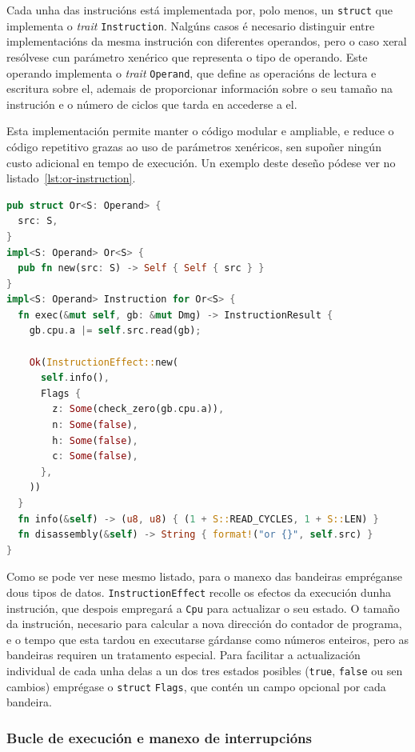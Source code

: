 Cada unha das instrucións está implementada por, polo menos, un \texttt{struct} que implementa o \textit{trait} \texttt{Instruction}.
Nalgúns casos é necesario distinguir entre implementacións da mesma instrución con diferentes operandos,
pero o caso xeral resólvese cun parámetro xenérico que representa o tipo de operando.
Este operando implementa o \textit{trait} \texttt{Operand}, que define as operacións de lectura e escritura sobre el,
ademais de proporcionar información sobre o seu tamaño na instrución e o número de ciclos que tarda en accederse a el.

Esta implementación permite manter o código modular e ampliable, e reduce o código repetitivo grazas ao uso de parámetros xenéricos,
sen supoñer ningún custo adicional en tempo de execución.
Un exemplo deste deseño pódese ver no listado~\ref{lst:or-instruction}.

\begin{lstlisting}[language=Rust, float=tbp, caption={Implementación da instrución \texttt{or}}, label={lst:or-instruction}]
pub struct Or<S: Operand> {
  src: S,
}
impl<S: Operand> Or<S> {
  pub fn new(src: S) -> Self { Self { src } }
}
impl<S: Operand> Instruction for Or<S> {
  fn exec(&mut self, gb: &mut Dmg) -> InstructionResult {
    gb.cpu.a |= self.src.read(gb);

    Ok(InstructionEffect::new(
      self.info(),
      Flags {
        z: Some(check_zero(gb.cpu.a)),
        n: Some(false),
        h: Some(false),
        c: Some(false),
      },
    ))
  }
  fn info(&self) -> (u8, u8) { (1 + S::READ_CYCLES, 1 + S::LEN) }
  fn disassembly(&self) -> String { format!("or {}", self.src) }
}
\end{lstlisting}

Como se pode ver nese mesmo listado, para o manexo das bandeiras empréganse dous tipos de datos.
\texttt{InstructionEffect} recolle os efectos da execución dunha instrución, que despois empregará a \texttt{Cpu} para actualizar o seu estado.
O tamaño da instrución, necesario para calcular a nova dirección do contador de programa, e o tempo que esta tardou en executarse
gárdanse como números enteiros, pero as bandeiras requiren un tratamento especial.
Para facilitar a actualización individual de cada unha delas a un dos tres estados posibles (\texttt{true}, \texttt{false} ou sen cambios)
emprégase o \texttt{struct} \texttt{Flags}, que contén un campo opcional por cada bandeira.

\subsubsection{Bucle de execución e manexo de interrupcións}

